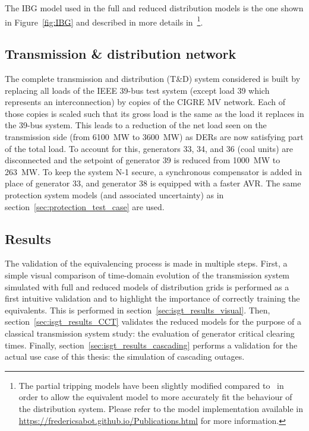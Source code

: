 The IBG model used in the full and reduced distribution models is the one shown in Figure~\ref{fig:IBG} and described in more details in~\cite{ChaspierreThesis}\footnote{The partial tripping models have been slightly modified compared to~\cite{ChaspierreThesis} in order to allow the equivalent model to more accurately fit the behaviour of the distribution system. Please refer to the model implementation available in \url{https://fredericsabot.github.io/Publications.html} for more information.}.

\subsection{Transmission \& distribution network}
\label{sec:isgt_TD}

The complete transmission and distribution (T\&D) system considered is built by replacing all loads of the IEEE 39-bus test system (except load 39 which represents an interconnection) by copies of the CIGRE MV network. Each of those copies is scaled such that its gross load is the same as the load it replaces in the 39-bus system. This leads to a reduction of the net load seen on the transmission side (from 6100~MW to 3600~MW) as DERs are now satisfying part of the total load. To account for this, generators 33, 34, and 36 (coal units) are disconnected and the setpoint of generator 39 is reduced from 1000~MW to 263~MW. To keep the system N-1 secure, a synchronous compensator is added in place of generator 33, and generator 38 is equipped with a faster AVR. The same protection system models (and associated uncertainty) as in section~\ref{sec:protection_test_case} are used.

\subsection{Results}
\label{sec:isgt_results}

The validation of the equivalencing process is made in multiple steps. First, a simple visual comparison of time-domain evolution of the transmission system simulated with full and reduced models of distribution grids is performed as a first intuitive validation and to highlight the importance of correctly training the equivalents. This is performed in section~\ref{sec:isgt_results_visual}. Then, section~\ref{sec:isgt_results_CCT} validates the reduced models for the purpose of a classical transmission system study: the evaluation of generator critical clearing times. Finally, section~\ref{sec:isgt_results_cascading} performs a validation for the actual use case of this thesis: the simulation of cascading outages.


